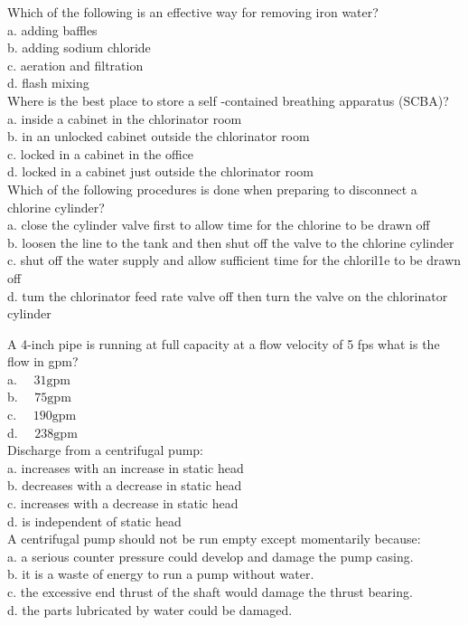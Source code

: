 Which of the following is an effective way for removing iron water?\\
a. adding baffles\\
b. adding sodium chloride\\
c. aeration and filtration\\
d. flash mixing\\

Where is the best place to store a self -contained breathing apparatus (SCBA)?\\
a. inside a cabinet in the chlorinator room\\
b. in an unlocked cabinet outside the chlorinator room\\
c. locked in a cabinet in the office\\
d. locked in a cabinet just outside the chlorinator room\\

Which of the following procedures is done when preparing to disconnect a chlorine cylinder?\\
a. close the cylinder valve first to allow time for the chlorine to be drawn off\\
b. loosen the line to the tank and then shut off the valve to the chlorine cylinder\\
c. shut off the water supply and allow sufficient time for the chloril1e to be drawn off\\
d. tum the chlorinator feed rate valve off then turn the valve on the chlorinator cylinder 

A 4-inch pipe is running at full capacity at a flow velocity of 5 fps what is the flow in gpm?\\
a. $\quad 31  \mathrm{gpm}$\\
b. $\quad 75 \mathrm{gpm}$\\
c. $\quad 190 \mathrm{gpm}$\\
d. $\quad 238 \mathrm{gpm}$\\

Discharge from a centrifugal pump:\\
a. increases with an increase in static head\\
b. decreases with a decrease in static head\\
c. increases with a decrease in static head\\
d. is independent of static head\\

A centrifugal pump should not be run empty except momentarily because:\\
a. a serious counter pressure could develop and damage the pump casing.\\
b. it is a waste of energy to run a pump without water.\\
c. the excessive end thrust of the shaft would damage the thrust bearing.\\
d. the parts lubricated by water could be damaged.\\

